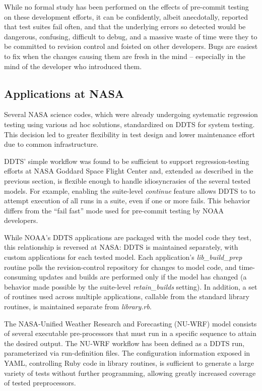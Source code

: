 \documentclass[conference]{IEEEtran}
\begin{document}
While no formal study has been performed on the effects of pre-commit testing on these development efforts, it can be confidently, albeit anecdotally, reported that test suites fail often, and that the underlying errors so detected would be dangerous, confusing, difficult to debug, and a massive waste of time were they to be committed to revision control and foisted on other developers. Bugs are easiest to fix when the changes causing them are fresh in the mind -- especially in the mind of the developer who introduced them.

\subsection{Applications at NASA}

Several NASA science codes, which were already undergoing systematic regression testing using various ad hoc solutions, standardized on DDTS for system testing. This decision led to greater flexibility in test design and lower maintenance effort due to common infrastructure.

DDTS' simple workflow was found to be sufficient to support regression-testing efforts at NASA Goddard Space Flight Center and, extended as described in the previous section, is flexible enough to handle idiosyncrasies of the several tested models. For example, enabling the suite-level \emph{continue} feature allows DDTS to to attempt execution of all runs in a suite, even if one or more fails. This behavior differs from the ``fail fast'' mode used for pre-commit testing by NOAA developers.

While NOAA's DDTS applications are packaged with the model code they test, this relationship is reversed at NASA: DDTS is maintained separately, with custom applications for each tested model. Each application's \emph{lib\_build\_prep} routine polls the revision-control repository for changes to model code, and time-consuming updates and builds are performed only if the model has changed (a behavior made possible by the suite-level \emph{retain\_builds} setting). In addition, a set of routines used across multiple applications, callable from the standard library routines, is maintained separate from \emph{library.rb}.

The NASA-Unified Weather Research and Forecasting (NU-WRF) \cite{nuwrf} model consists of several executable pre-processors that must run in a specific sequence to attain the desired output. The NU-WRF workflow has been defined as a DDTS run, parameterized via run-definition files. The configuration information exposed in YAML, controlling Ruby code in library routines, is sufficient to generate a large variety of tests without further programming, allowing greatly increased coverage of tested preprocessors.
\end{document}
